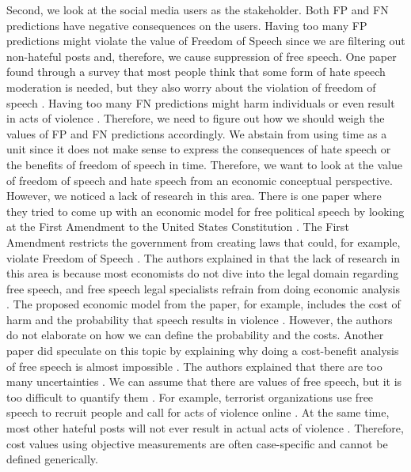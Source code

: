 Second, we look at the social media users as the stakeholder.
%
Both FP and FN predictions have negative consequences on the users.
%
Having too many FP predictions might violate the value of Freedom of Speech since we are filtering out non-hateful posts and, therefore, we cause suppression of free speech.
%
One paper found through a survey that most people think that some form of hate speech moderation is needed, but they also worry about the violation of freedom of speech \citep{olteanu2017limits}.
%
Having too many FN predictions might harm individuals or even result in acts of violence \citep{ecri-hate-speech-and-violence}.
%
Therefore, we need to figure out how we should weigh the values of FP and FN predictions accordingly.
%
We abstain from using time as a unit since it does not make sense to express the consequences of hate speech or the benefits of freedom of speech in time.
%
Therefore, we want to look at the value of freedom of speech and hate speech from an economic conceptual perspective.
%
However, we noticed a lack of research in this area.
%
There is one paper where they tried to come up with an economic model for free political speech by looking at the First Amendment to the United States Constitution \citep{posner1986free}.
%
The First Amendment restricts the government from creating laws that could, for example, violate Freedom of Speech \citep{first-amendment-white-house}.
%
The authors explained in \citet{posner1986free} that the lack of research in this area is because most economists do not dive into the legal domain regarding free speech, and free speech legal specialists refrain from doing economic analysis \citep{posner1986free}.
%
The proposed economic model from the paper, for example, includes the cost of harm and the probability that speech results in violence \citep{posner1986free}.
%
However, the authors do not elaborate on how we can define the probability and the costs. Another paper did speculate on this topic by explaining why doing a cost-benefit analysis of free speech is almost impossible \citep{sunstein2018does}.
%
The authors explained that there are too many uncertainties \citep{sunstein2018does}.
%
We can assume that there are values of free speech, but it is too difficult to quantify them \citep{sunstein2018does}.
%
For example, terrorist organizations use free speech to recruit people and call for acts of violence online \citep{sunstein2018does}.
%
At the same time, most other hateful posts will not ever result in actual acts of violence \citep{sunstein2018does}.
%
Therefore, cost values using objective measurements are often case-specific and cannot be defined generically.
